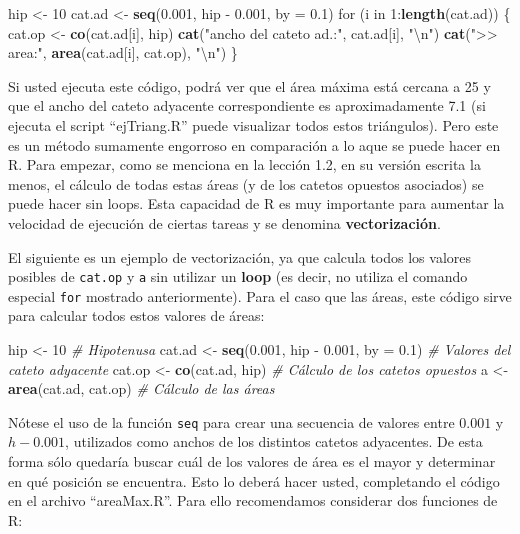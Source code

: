 \documentclass[]{article}
\newenvironment{Shaded}{}{}
\newcommand{\KeywordTok}[1]{\textcolor[rgb]{0.00,0.44,0.13}{\textbf{{#1}}}}
\newcommand{\DataTypeTok}[1]{\textcolor[rgb]{0.56,0.13,0.00}{{#1}}}
\newcommand{\DecValTok}[1]{\textcolor[rgb]{0.25,0.63,0.44}{{#1}}}
\newcommand{\FloatTok}[1]{\textcolor[rgb]{0.25,0.63,0.44}{{#1}}}
\newcommand{\CharTok}[1]{\textcolor[rgb]{0.25,0.44,0.63}{{#1}}}
\newcommand{\StringTok}[1]{\textcolor[rgb]{0.25,0.44,0.63}{{#1}}}
\newcommand{\CommentTok}[1]{\textcolor[rgb]{0.38,0.63,0.69}{\textit{{#1}}}}
\newcommand{\NormalTok}[1]{{#1}}
\begin{document}
\begin{Shaded}
\begin{Highlighting}[]
\NormalTok{hip <- }\DecValTok{10}
\NormalTok{cat.ad <- }\KeywordTok{seq}\NormalTok{(}\FloatTok{0.001}\NormalTok{, hip - }\FloatTok{0.001}\NormalTok{, }\DataTypeTok{by =} \FloatTok{0.1}\NormalTok{)}
\NormalTok{for (i in }\DecValTok{1}\NormalTok{:}\KeywordTok{length}\NormalTok{(cat.ad)) \{}
    \NormalTok{cat.op <- }\KeywordTok{co}\NormalTok{(cat.ad[i], hip)}
    \KeywordTok{cat}\NormalTok{(}\StringTok{"ancho del cateto ad.:"}\NormalTok{, cat.ad[i], }\StringTok{"}\CharTok{\textbackslash{}n}\StringTok{"}\NormalTok{)}
    \KeywordTok{cat}\NormalTok{(}\StringTok{">> area:"}\NormalTok{, }\KeywordTok{area}\NormalTok{(cat.ad[i], cat.op), }\StringTok{"}\CharTok{\textbackslash{}n}\StringTok{"}\NormalTok{)}
\NormalTok{\}}
\end{Highlighting}
\end{Shaded}
Si usted ejecuta este código, podrá ver que el área máxima está cercana
a 25 y que el ancho del cateto adyacente correspondiente es
aproximadamente 7.1 (si ejecuta el script ``ejTriang.R'' puede
visualizar todos estos triángulos). Pero este es un método sumamente
engorroso en comparación a lo aque se puede hacer en R. Para empezar,
como se menciona en la lección 1.2, en su versión escrita la menos, el
cálculo de todas estas áreas (y de los catetos opuestos asociados) se
puede hacer sin loops. Esta capacidad de R es muy importante para
aumentar la velocidad de ejecución de ciertas tareas y se denomina
\textbf{vectorización}.

El siguiente es un ejemplo de vectorización, ya que calcula todos los
valores posibles de \texttt{cat.op} y \texttt{a} sin utilizar un
\textbf{loop} (es decir, no utiliza el comando especial \texttt{for}
mostrado anteriormente). Para el caso que las áreas, este código sirve
para calcular todos estos valores de áreas:

\begin{Shaded}
\begin{Highlighting}[]
\NormalTok{hip <- }\DecValTok{10}  \CommentTok{# Hipotenusa}
\NormalTok{cat.ad <- }\KeywordTok{seq}\NormalTok{(}\FloatTok{0.001}\NormalTok{, hip - }\FloatTok{0.001}\NormalTok{, }\DataTypeTok{by =} \FloatTok{0.1}\NormalTok{)  }\CommentTok{# Valores del cateto adyacente}
\NormalTok{cat.op <- }\KeywordTok{co}\NormalTok{(cat.ad, hip)  }\CommentTok{# Cálculo de los catetos opuestos}
\NormalTok{a <- }\KeywordTok{area}\NormalTok{(cat.ad, cat.op)  }\CommentTok{# Cálculo de las áreas}
\end{Highlighting}
\end{Shaded}
Nótese el uso de la función \texttt{seq} para crear una secuencia de
valores entre $0.001$ y $h - 0.001$, utilizados como anchos de los
distintos catetos adyacentes. De esta forma sólo quedaría buscar cuál de
los valores de área es el mayor y determinar en qué posición se
encuentra. Esto lo deberá hacer usted, completando el código en el
archivo ``areaMax.R''. Para ello recomendamos considerar dos funciones
de R:
\end{document}
